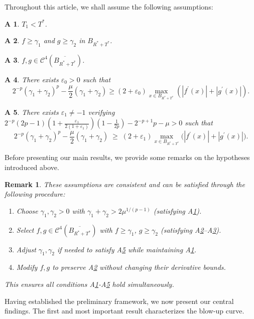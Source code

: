 \documentclass[
  sn-mathphys-num,
  colorlinks,
  linkcolor=darkmagenta,
  citecolor=rufous,
  urlcolor=zaffre,
  hypertexnames=false
]{sn-jnl}
\numberwithin{equation}{section}
\newtheorem{remark}[theorem]{Remark}%
\newtheorem{assumption}{A}
\begin{document}
Throughout this article, we shall assume the following assumptions:
\begin{assumption}\label{A1}
$T_1 < T^*$.
\end{assumption}

\begin{assumption}\label{A2} $f \geq \gamma_1$ and $g \geq \gamma_2$ in $B_{R^* + T^*}$.
\end{assumption}

\begin{assumption}\label{A3} $f, g \in \mathcal{C}^4(\overline{B_{R^* + T^*}})$.
\end{assumption}

\begin{assumption}\label{A4} There exists $\varepsilon_0 > 0$ such that
$$
2^{-p}(\gamma_1 + \gamma_2)^p - \frac{\mu}{2}(\gamma_1 + \gamma_2) \geq (2 + \varepsilon_0) \max_{x \in B_{R^*+T^*}} (|f^\prime(x)| + |g^\prime(x)|).
$$
\end{assumption}
\begin{assumption}\label{A5} There exists $\varepsilon_1 \neq -1$ verifying
\(
2^{-p}(2p-1)\!\left(1+\frac{\varepsilon_1}{2(1+\varepsilon_1)}\right)\!\left(1-\frac{1}{2p}\right)
-2^{-p+1}p-\mu >0
\)
such that
$$
2^{-p}(\gamma_1 + \gamma_2)^p - \frac{\mu}{2}(\gamma_1 + \gamma_2) 
\;\geq\; (2+\varepsilon_1)\max_{x \in B_{R^*+T^*}} \bigl(|f^\prime(x)| + |g^\prime(x)|\bigr).
$$
\end{assumption} 

Before presenting our main results, we provide some remarks on the hypotheses introduced above.
\begin{remark}
These assumptions are consistent and can be satisfied through the following procedure:
\begin{enumerate}
    \item Choose $\gamma_1, \gamma_2 > 0$ with $\gamma_1 + \gamma_2 > 2\mu^{1/(p-1)}$ (satisfying A\ref{A1}).
    \item Select $f,g \in \mathcal{C}^4(\overline{B_{R^* + T^*}})$ with $f \geq \gamma_1$, $g \geq \gamma_2$ (satisfying A\ref{A2}--A\ref{A3}).
    \item Adjust $\gamma_1, \gamma_2$ if needed to satisfy A\ref{A5} while maintaining A\ref{A1}.
    \item Modify $f,g$ to preserve A\ref{A2} without changing their derivative bounds.
\end{enumerate}
This ensures all conditions A\ref{A1}-A\ref{A5} hold simultaneously.
\end{remark}
Having established the preliminary framework, we now present our central findings. The first and most important result characterizes the blow-up curve.
\end{document}
